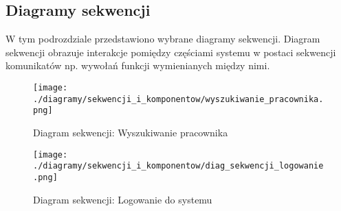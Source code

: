 \subsection{Diagramy sekwencji}
W tym podrozdziale przedstawiono wybrane diagramy sekwencji. Diagram sekwencji obrazuje interakcje pomiędzy częściami systemu w postaci sekwencji komunikatów np. wywołań funkcji wymienianych między nimi. 

\begin{figure}[h]
    \centering
    \texttt{[image: ./diagramy/sekwencji\_i\_komponentow/wyszukiwanie\_pracownika.png]}
    \caption{Diagram sekwencji: Wyszukiwanie pracownika}
    \label{fig:wyszukiwanie_pracownika}
\end{figure} 

\begin{figure}[h]
    \centering
    \texttt{[image: ./diagramy/sekwencji\_i\_komponentow/diag\_sekwencji\_logowanie.png]}
    \caption{Diagram sekwencji: Logowanie do systemu}
    \label{fig:diag_sekwencji_logowanie.png}
\end{figure} 
